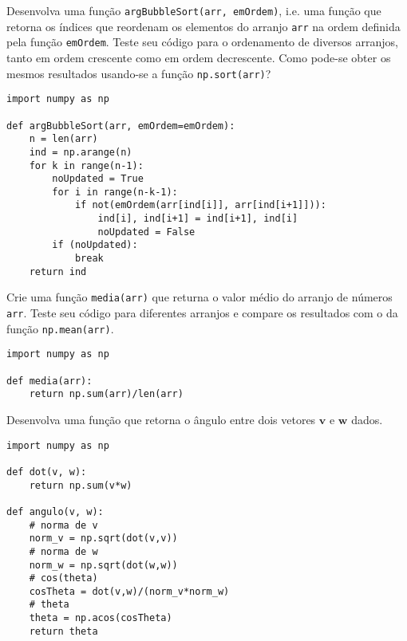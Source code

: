 \begin{exer}
  Desenvolva uma função \lstinline+argBubbleSort(arr, emOrdem)+, i.e. uma função que retorna os índices que reordenam os elementos do arranjo \lstinline+arr+ na ordem definida pela função \lstinline+emOrdem+. Teste seu código para o ordenamento de diversos arranjos, tanto em ordem crescente como em ordem decrescente. Como pode-se obter os mesmos resultados usando-se a função \lstinline+np.sort(arr)+?
\end{exer}
\begin{resp}

\begin{lstlisting}
import numpy as np

def argBubbleSort(arr, emOrdem=emOrdem):
    n = len(arr)
    ind = np.arange(n)
    for k in range(n-1):
        noUpdated = True
        for i in range(n-k-1):
            if not(emOrdem(arr[ind[i]], arr[ind[i+1]])):
                ind[i], ind[i+1] = ind[i+1], ind[i]
                noUpdated = False
        if (noUpdated):
            break
    return ind
\end{lstlisting}

\end{resp}

\begin{exer}
  Crie uma função \lstinline+media(arr)+ que returna o valor médio do arranjo de números \lstinline+arr+. Teste seu código para diferentes arranjos e compare os resultados com o da função \lstinline+np.mean(arr)+.
\end{exer}
\begin{resp}

\begin{lstlisting}
import numpy as np

def media(arr):
    return np.sum(arr)/len(arr)
\end{lstlisting}

\end{resp}

\begin{exer}
  Desenvolva uma função que retorna o ângulo entre dois vetores $\pmb{v}$ e $\pmb{w}$ dados.
\end{exer}
\begin{resp}

\begin{lstlisting}
import numpy as np

def dot(v, w):
    return np.sum(v*w)

def angulo(v, w):
    # norma de v
    norm_v = np.sqrt(dot(v,v))
    # norma de w
    norm_w = np.sqrt(dot(w,w))
    # cos(theta)
    cosTheta = dot(v,w)/(norm_v*norm_w)
    # theta
    theta = np.acos(cosTheta)
    return theta
\end{lstlisting}

\end{resp}

